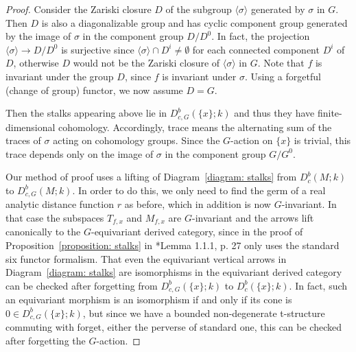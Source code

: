 \documentclass[11pt,letterpaper]{amsart}
\numberwithin{equation}{section}
\begin{document}
\begin{proof}
Consider the Zariski closure $D$ of the subgroup $\langle \sigma \rangle$ generated by $\sigma$ in $G$.
Then $D$ is also a diagonalizable group and has cyclic component group generated by the image of $\sigma$ in the component group $D/D^0$.
In fact, the projection $\langle \sigma \rangle \to D/D^0$ is surjective since $\langle \sigma \rangle \cap D^i \ne \emptyset$ for each connected component $D^i$ of $D$, otherwise $D$ would not be the Zariski closure of $\langle \sigma \rangle$ in $G$.
Note that $f$ is invariant under the group $D$, since $f$ is invariant under $\sigma$.
Using a forgetful (change of group) functor, we now assume $D=G$. 

Then the stalks appearing above lie in $D^b_{c,G}(\{x\};k)$ and thus they have finite-dimensional cohomology.
Accordingly, trace means the alternating sum of the traces of $\sigma$ acting on cohomology groups. 
Since the $G$-action on $\{ x\}$ is trivial, this trace depends only on the image of $\sigma$ in the component group $G/G^0$.


Our method of proof uses a lifting of Diagram~\eqref{diagram: stalks} from $D^b_{c}(M;k)$ to $D^b_{c,G}(M;k)$. 
In order to do this, we only need to find the germ of a real analytic distance function $r$ as before, which in addition is now $G$-invariant. 
In that case the subspaces $T_{f,x}$ and $M_{f,x}$ are $G$-invariant and the arrows lift canonically to the $G$-equivariant derived category, since in the proof of Proposition~\ref{proposition: stalks} in \cite{Sch03}*{Lemma 1.1.1, p. 27} only uses the standard six functor formalism.
That even the equivariant vertical arrows in Diagram~\eqref{diagram: stalks} are isomorphisms in the equivariant derived category can be checked after forgetting from $D^b_{c,G}(\{x\};k)$ to $D^b_{c}(\{x\};k)$. 
In fact, such an equivariant morphism is an isomorphism if and only if its cone is $0 \in D^b_{c,G}(\{x\};k)$, but since we have a bounded non-degenerate t-structure commuting with forget, either the perverse of standard one, this can be checked after forgetting the $G$-action.


\end{proof}
\end{document}
